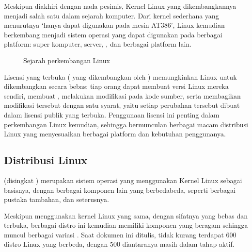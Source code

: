 \documentclass[letterpaper,10pt,english]{sphinxmanual}
\begin{document}
Meskipun diakhiri dengan nada pesimis, Kernel Linux yang dikembangkannya menjadi salah satu  dalam sejarah komputer. Dari kernel sederhana yang menurutnya ‘hanya dapat digunakan pada mesin AT\sphinxhyphen{}386’, Linux kemudian berkembang menjadi sistem operasi yang dapat digunakan pada berbagai platform: super komputer, server, , dan berbagai platform lain.

\begin{figure}[htbp]
\centering
\capstart

\noindent{}
\caption{Sejarah perkembangan Linux}\label{\detokenize{sesi1/pengantarlinux:sejarah-linux}}\end{figure}

Lisensi yang terbuka ( yang dikembangkan oleh ) memungkinkan Linux untuk dikembangkan secara bebas: tiap orang dapat membuat versi Linux mereka sendiri, membuat , melakukan modifikasi pada kode sumber, serta membagikan modifikasi tersebut dengan satu syarat, yaitu setiap perubahan tersebut dibuat dalam lisensi publik yang terbuka. Penggunaan lisensi ini penting dalam perkembangan Linux kemudian, sehingga bermunculan berbagai macam distribusi Linux yang menyesuaikan berbagai platform dan kebutuhan penggunanya.


\subsection{Distribusi Linux}
\label{\detokenize{sesi1/pengantarlinux:distribusi-linux}}
 (disingkat ) merupakan sistem operasi yang menggunakan Kernel Linux sebagai basisnya, dengan berbagai komponen lain yang berbeda\sphinxhyphen{}beda, seperti  berbagai pustaka tambahan, dan seterusnya.

Meskipun menggunakan kernel Linux yang sama, dengan sifatnya yang bebas dan terbuka, berbagai distro ini kemudian memiliki komponen yang beragam sehingga muncul berbagai variasi . Saat dokumen ini ditulis, tidak kurang terdapat 600 distro Linux yang berbeda, dengan 500 diantaranya masih dalam tahap  aktif.
\end{document}
